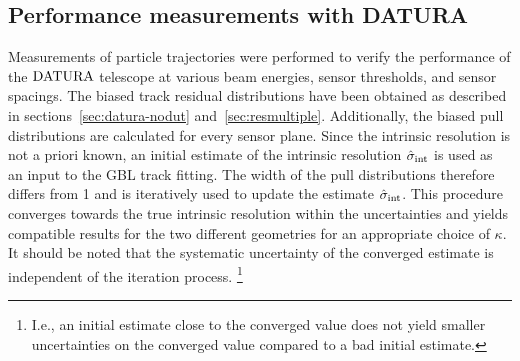 \subsection{Performance measurements with DATURA}
\label{sec:measurements}

Measurements of particle trajectories were performed to verify the performance of the $\textrm{DATURA}$ telescope at various beam energies, sensor thresholds, and sensor spacings. %
The biased track residual distributions have been obtained as described in sections~\ref{sec:datura-nodut} and~\ref{sec:resmultiple}. 
% 
Additionally, the biased pull distributions are calculated for every sensor plane. 
Since the intrinsic resolution is not a priori known, an initial estimate of the intrinsic resolution $\hat{\sigma}_{\textrm{int}}$ is used as an input to the GBL track fitting. 
The width of the pull distributions therefore differs from 1 and is iteratively used to update the estimate $\hat{\sigma}_{\textrm{int}}$.
This procedure converges towards the true intrinsic resolution within the uncertainties and yields compatible results for the two different geometries for an appropriate choice of $\kappa$. 
It should be noted that the systematic uncertainty of the converged estimate is independent of the iteration process.
\footnote{I.e., an initial estimate close to the converged value does not yield smaller uncertainties on the converged value compared to a bad initial estimate.}


